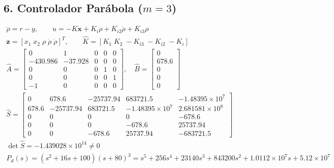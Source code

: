 \documentclass[11pt]{article}
\begin{document}
\subsection*{6. Controlador Parábola ($m=3$)}
\begin{gather*}
\dddot\rho=r-y,\qquad u=-K\mathbf x+K_i\ddot\rho+K_{i2}\dot\rho+K_{i3}\rho\\
\mathbf z=[x_1\;x_2\;\rho\;\dot\rho\;\ddot\rho]^T,\qquad\hat K=[K_1\;K_2\;-K_{i3}\;-K_{i2}\;-K_i]\\
\hat A=\begin{bmatrix}0 & 1 & 0 & 0 & 0 \\ -430.986 & -37.928 & 0 & 0 & 0 \\ 0 & 0 & 0 & 1 & 0 \\ 0 & 0 & 0 & 0 & 1 \\ -1 & 0 & 0 & 0 & 0\end{bmatrix},\quad\hat B=\begin{bmatrix}0 \\ 678.6 \\ 0 \\ 0 \\ 0\end{bmatrix}\\
\hat S=\begin{bmatrix}0 & 678.6 & -25737.94 & 683721.5 & -1.48395\times10^{7} \\ 678.6 & -25737.94 & 683721.5 & -1.48395\times10^{7} & 2.681581\times10^{8} \\ 0 & 0 & 0 & 0 & -678.6 \\ 0 & 0 & 0 & -678.6 & 25737.94 \\ 0 & 0 & -678.6 & 25737.94 & -683721.5\end{bmatrix}\\
\det\hat S=-1.439028\times10^{14}\ne0\\
P_d(s)=(s^{2} + 16s + 100)(s+80)^{3}=s^{5} + 256s^{4} + 23140s^{3} + 843200s^{2} + 1.0112\times10^{7}s + 5.12\times10^{7}
\end{gather*}
\end{document}
